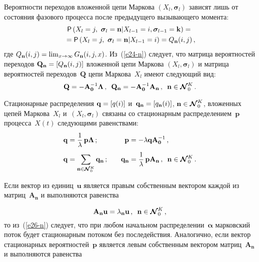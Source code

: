 {\begin{multicols}{2}
  Вероятности переходов вложенной цепи Маркова 
$(X_l,\boldsymbol{\sigma}_l)$ зависят лишь от состояния фазового процесса 
после предыдущего вызывающего мо\-мента:
  \begin{multline*}
  {\sf P} \left(X_l =j,\ \boldsymbol{\sigma}_l= \mathbf{n}
  \vert X_{l-1}=i, \boldsymbol{\sigma}_{l-1}= 
\mathbf{k}\right) ={}\\
  {}= {\sf P}\left( X_l=j,\ \boldsymbol{\sigma}_l= \mathbf{n} 
\vert X_{l-1}=i\right) =Q_{\mathbf{n}}(i,j)\,,
  \end{multline*}
где $Q_{\mathbf{n}}(i,j)\hm= 
\lim\nolimits_{x\to\infty} G_{\mathbf{n}}(i,j,x)$. 
Из~(\ref{e24-n}) следует, что матрица вероятностей переходов 
$\mathbf{Q}_{\mathbf{n}}\hm= [Q_{\mathbf{n}}(i,j)]$ вложенной цепи Маркова 
$(X_l, \boldsymbol{\sigma}_l)$ и матрица вероятностей 
переходов~$\mathbf{Q}$ цепи Маркова~$X_l$ имеют следующий вид:
\begin{equation*}
\mathbf{Q}=-\mathbf{A}_{\mathbf{0}}^{-1}\boldsymbol{\Lambda}\,,\enskip
\mathbf{Q}_{\mathbf{n}}= 
-\mathbf{A}_{\mathbf{0}}^{-1}\mathbf{A}_{\mathbf{n}}\,,\enskip
\mathbf{n}\in\boldsymbol{\mathcal{N}}_0^K\,.
\end{equation*}
                       
  Стационарные распределения $\mathbf{q}\hm= [q(i)]$ 
и~$\mathbf{q}_{\mathbf{n}}\hm= [q_{\mathbf{n}}(i)]$, $\mathbf{n}\hm\in 
\boldsymbol{\mathcal{N}}_0^K$, вложенных цепей Маркова~$X_l$ 
и~$(X_l,\boldsymbol{\sigma}_l)$ связаны со стационарным 
распределением~$\mathbf{p}$ процесса~$X(t)$ следующими равенствами:
 \begin{alignat*}{2}
  \mathbf{q}&=\fr{1}{\lambda}\,\mathbf{p}\boldsymbol{\Lambda}\,;&\quad
  \mathbf{p}&=-\lambda \mathbf{q}\mathbf{A}_{\mathbf{0}}^{-1}\,,\\
  \mathbf{q}&=\sum\limits_{\mathbf{n}\in \boldsymbol{\mathcal{N}}_0^K} 
\mathbf{q}_{\mathbf{n}}\,; &\quad
  \mathbf{q}_{\mathbf{n}}& = 
\fr{1}{\lambda}\,\mathbf{p}\mathbf{A}_{\mathbf{n}}\,,\enskip
  \mathbf{n}\in \boldsymbol{\mathcal{N}}_0^K\,.
  \end{alignat*}
  
  Если вектор из единиц~$\mathbf{u}$ является правым собственным вектором 
каждой из матриц~$\mathbf{A}_{\mathbf{n}}$ и выполняются равенства 

\noindent
  \begin{equation*}
  \mathbf{A}_{\mathbf{n}} \mathbf{u} =\lambda_{\mathbf{n}} 
\mathbf{u}\,,\enskip \mathbf{n}\in \boldsymbol{\mathcal{N}}_0^K\,,
  \end{equation*}
то из~(\ref{e26-n}) следует, что при любом начальном 
распределении~$\boldsymbol{\alpha}$ марковский поток будет стационарным потоком 
без последействия. Аналогично, если вектор стационарных 
вероятностей~$\mathbf{p}$ является левым собственным вектором 
матриц~$\mathbf{A}_{\mathbf{n}}$  и выполняются равенства 


\end{multicols}}
